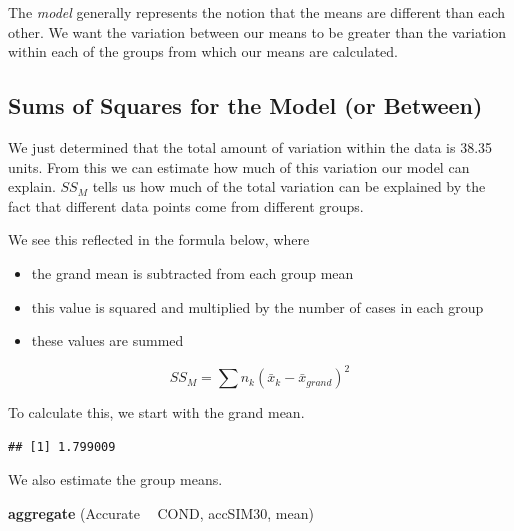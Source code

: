 \documentclass[
  english,
]{book}
\newenvironment{Shaded}{\begin{snugshade}}{\end{snugshade}}
\newcommand{\KeywordTok}[1]{\textcolor[rgb]{0.13,0.29,0.53}{\textbf{#1}}}
\newcommand{\NormalTok}[1]{#1}
\newcommand{\OperatorTok}[1]{\textcolor[rgb]{0.81,0.36,0.00}{\textbf{#1}}}
\newcommand{\StringTok}[1]{\textcolor[rgb]{0.31,0.60,0.02}{#1}}
\providecommand{\tightlist}{%
  \setlength{\itemsep}{0pt}\setlength{\parskip}{0pt}}
\begin{document}
The \emph{model} generally represents the notion that the means are different than each other. We want the variation between our means to be greater than the variation within each of the groups from which our means are calculated.

\hypertarget{sums-of-squares-for-the-model-or-between}{%
\subsection{Sums of Squares for the Model (or Between)}\label{sums-of-squares-for-the-model-or-between}}

We just determined that the total amount of variation within the data is 38.35 units. From this we can estimate how much of this variation our model can explain. \(SS_M\) tells us how much of the total variation can be explained by the fact that different data points come from different groups.

We see this reflected in the formula below, where

\begin{itemize}
\tightlist
\item
  the grand mean is subtracted from each group mean
\item
  this value is squared and multiplied by the number of cases in each group
\item
  these values are summed
\end{itemize}

\[SS_{M}= \sum n_{k}(\bar{x}_{k}-\bar{x}_{grand})^{2}\]

To calculate this, we start with the grand mean.

\begin{Shaded}
\end{Shaded}

\begin{verbatim}
## [1] 1.799009
\end{verbatim}

We also estimate the group means.

\begin{Shaded}
\begin{Highlighting}[]
\KeywordTok{aggregate}\NormalTok{ (Accurate }\OperatorTok{~}\StringTok{ }\NormalTok{COND, accSIM30, mean)}
\end{Highlighting}
\end{Shaded}
\end{document}
